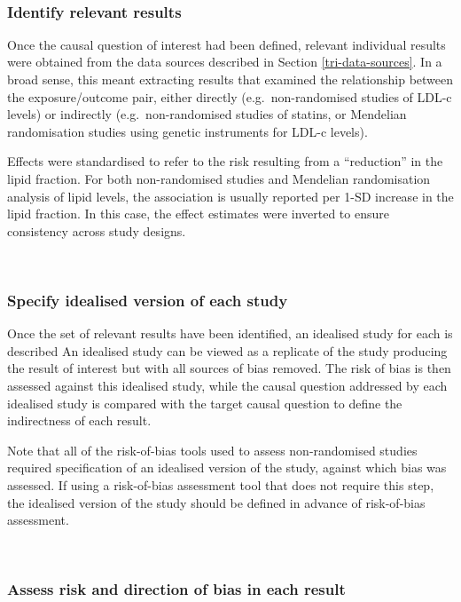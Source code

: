 \documentclass[a4paper, twoside]{templates/ociamthesis}
\begin{document}
~

\hypertarget{identify-relevant-results}{%
\subsubsection{Identify relevant results}\label{identify-relevant-results}}

Once the causal question of interest had been defined, relevant individual results were obtained from the data sources described in Section \ref{tri-data-sources}. In a broad sense, this meant extracting results that examined the relationship between the exposure/outcome pair, either directly (e.g.~non-randomised studies of LDL-c levels) or indirectly (e.g.~non-randomised studies of statins, or Mendelian randomisation studies using genetic instruments for LDL-c levels).

Effects were standardised to refer to the risk resulting from a ``reduction'' in the lipid fraction. For both non-randomised studies and Mendelian randomisation analysis of lipid levels, the association is usually reported per 1-SD increase in the lipid fraction. In this case, the effect estimates were inverted to ensure consistency across study designs.

~

\hypertarget{specify-idealised-version-of-each-study}{%
\subsubsection{Specify idealised version of each study}\label{specify-idealised-version-of-each-study}}

Once the set of relevant results have been identified, an idealised study for each is described
An idealised study can be viewed as a replicate of the study producing the result of interest but with all sources of bias removed. The risk of bias is then assessed against this idealised study, while the causal question addressed by each idealised study is compared with the target causal question to define the indirectness of each result.

Note that all of the risk-of-bias tools used to assess non-randomised studies required specification of an idealised version of the study, against which bias was assessed. If using a risk-of-bias assessment tool that does not require this step, the idealised version of the study should be defined in advance of risk-of-bias assessment.

~

\hypertarget{assess-risk-and-direction-of-bias-in-each-result}{%
\subsubsection{Assess risk and direction of bias in each result}\label{assess-risk-and-direction-of-bias-in-each-result}}
\end{document}
